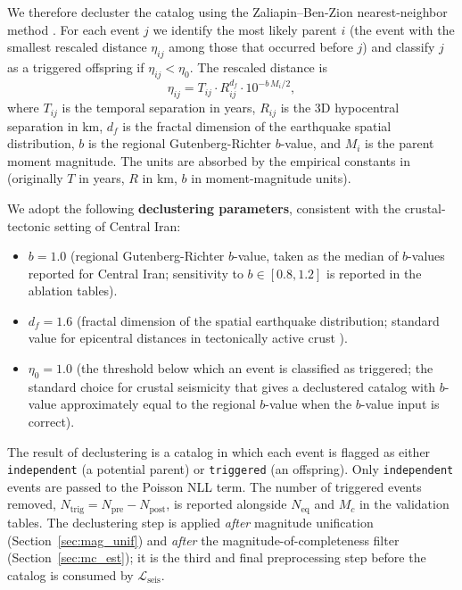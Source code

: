 \documentclass[11pt, a4paper]{article}
\begin{document}
We therefore decluster the catalog using the Zaliapin--Ben-Zion nearest-neighbor method \cite{Zaliapin2008}. For each event $j$ we identify the most likely parent $i$ (the event with the smallest rescaled distance $\eta_{ij}$ among those that occurred before $j$) and classify $j$ as a triggered offspring if $\eta_{ij} < \eta_0$. The rescaled distance is
\begin{equation}
    \eta_{ij} = T_{ij} \cdot R_{ij}^{d_f} \cdot 10^{-b\,M_i / 2},
    \label{eq:zb_distance}
\end{equation}
where $T_{ij}$ is the temporal separation in years, $R_{ij}$ is the 3D hypocentral separation in km, $d_f$ is the fractal dimension of the earthquake spatial distribution, $b$ is the regional Gutenberg-Richter $b$-value, and $M_i$ is the parent moment magnitude. The units are absorbed by the empirical constants in \cite{Zaliapin2008} (originally $T$ in years, $R$ in km, $b$ in moment-magnitude units).

We adopt the following \textbf{declustering parameters}, consistent with the crustal-tectonic setting of Central Iran:
\begin{itemize}
    \item $b = 1.0$ (regional Gutenberg-Richter $b$-value, taken as the median of $b$-values reported for Central Iran; sensitivity to $b \in [0.8, 1.2]$ is reported in the ablation tables).
    \item $d_f = 1.6$ (fractal dimension of the spatial earthquake distribution; standard value for epicentral distances in tectonically active crust \cite{Zaliapin2008}).
    \item $\eta_0 = 1.0$ (the threshold below which an event is classified as triggered; the standard choice for crustal seismicity that gives a declustered catalog with $b$-value approximately equal to the regional $b$-value when the $b$-value input is correct).
\end{itemize}
The result of declustering is a catalog in which each event is flagged as either \texttt{independent} (a potential parent) or \texttt{triggered} (an offspring). Only \texttt{independent} events are passed to the Poisson NLL term. The number of triggered events removed, $N_{\text{trig}} = N_{\text{pre}} - N_{\text{post}}$, is reported alongside $N_{\text{eq}}$ and $M_c$ in the validation tables. The declustering step is applied \emph{after} magnitude unification (Section~\ref{sec:mag_unif}) and \emph{after} the magnitude-of-completeness filter (Section~\ref{sec:mc_est}); it is the third and final preprocessing step before the catalog is consumed by $\mathcal{L}_{\text{seis}}$.
\end{document}
